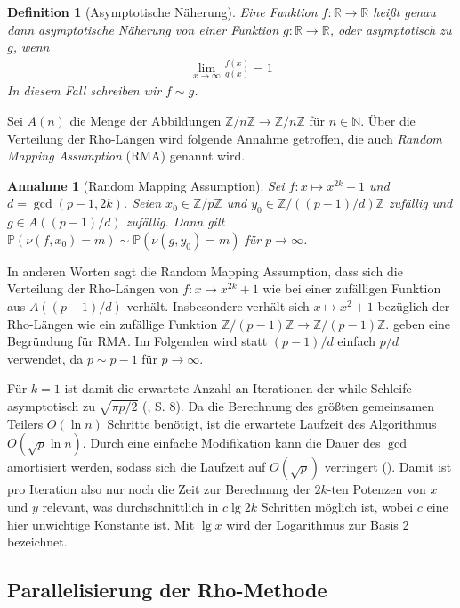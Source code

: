 \documentclass[a4paper, 11pt, ngerman]{article}
\newcommand{\N}{\mathbb{N}}
\newcommand{\R}{\mathbb{R}}
\newcommand{\Z}{\mathbb{Z}}
\renewcommand{\P}{\mathbb{P}}
\newtheorem{definition}{Definition}
\newtheorem*{assumption*}{Annahme}
\begin{document}
\begin{definition}[Asymptotische Näherung]
    Eine Funktion $f : \R \to \R$ heißt genau dann asymptotische Näherung von einer Funktion $g : \R \to \R$, oder asymptotisch zu $g$, wenn
    \begin{align*}
        \lim_{x \to \infty} \frac {f(x)} {g(x)} = 1
    \end{align*}
    In diesem Fall schreiben wir $f \sim g$.
\end{definition}

\noindent Sei $A(n)$ die Menge der Abbildungen $\Z/n\Z \to \Z/n\Z$ für $n \in \N$. Über die Verteilung der Rho-Längen wird folgende Annahme getroffen, die auch \emph{Random Mapping Assumption} (RMA) genannt wird.

\begin{assumption*}[Random Mapping Assumption]
    Sei $f : x \mapsto x^{2k} + 1$ und $d = \gcd(p - 1, 2k)$. Seien $x_0 \in \Z/p\Z$ und $y_0 \in \Z/((p - 1)/d)\Z$ zufällig und $g \in A((p - 1)/d)$ zufällig. Dann gilt $\P(\nu(f, x_0) = m) \sim \P(\nu(g, y_0) = m)$ für $p \to \infty$.
\end{assumption*}

\noindent In anderen Worten sagt die Random Mapping Assumption, dass sich die Verteilung der Rho-Längen von $f : x \mapsto x^{2k} + 1$ wie bei einer zufälligen Funktion aus $A((p - 1)/d)$ verhält. Insbesondere verhält sich $x \mapsto x^2 + 1$ bezüglich der Rho-Längen wie ein zufällige Funktion $\Z/(p - 1)\Z \to \Z/(p - 1)\Z$. \cite{bp81} geben eine Begründung für RMA. Im Folgenden wird statt $(p - 1)/d$ einfach $p/d$ verwendet, da $p \sim p - 1$ für $p \to \infty$.

Für $k = 1$ ist damit die erwartete Anzahl an Iterationen der while-Schleife asymptotisch zu $\sqrt{\pi p / 2}$ (\cite{knu98}, S. 8). Da die Berechnung des größten gemeinsamen Teilers $O(\ln n)$ Schritte benötigt, ist die erwartete Laufzeit des Algorithmus $O(\sqrt p \ln n)$. Durch eine einfache Modifikation kann die Dauer des $\gcd$ amortisiert werden, sodass sich die Laufzeit auf $O(\sqrt p)$ verringert (\cite{bre80}). Damit ist pro Iteration also nur noch die Zeit zur Berechnung der $2k$-ten Potenzen von $x$ und $y$ relevant, was durchschnittlich in $c \lg 2k$ Schritten möglich ist, wobei $c$ eine hier unwichtige Konstante ist. Mit $\lg x$ wird der Logarithmus zur Basis 2 bezeichnet.

\subsection{Parallelisierung der Rho-Methode}
\end{document}
